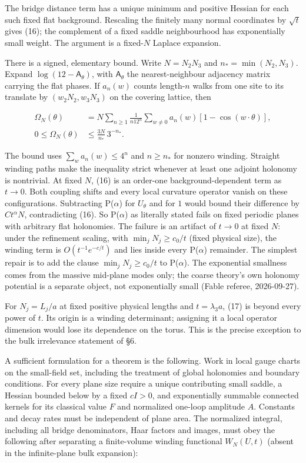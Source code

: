 \documentclass[11pt,a4paper]{article}
\begin{document}
The bridge distance term has a unique minimum and positive Hessian for
each such fixed flat background. Rescaling the finitely many normal
coordinates by \(\sqrt t\) gives (16); the complement of a fixed saddle
neighbourhood has exponentially small weight. The argument is a
fixed-\(N\) Laplace expansion.

There is a signed, elementary bound. Write \(N=N_2N_3\) and
\(n_*=\min(N_2,N_3)\). Expand \(\log(12-\mathsf A_\theta)\), with
\(\mathsf A_\theta\) the nearest-neighbour adjacency matrix carrying the
flat phases. If \(a_n(w)\) counts length-\(n\) walks from one site to
its translate by \((w_2N_2,w_3N_3)\) on the covering lattice, then

\[\begin{aligned}
\Omega_N(\theta)
 &=N\sum_{n\ge1}\frac1{n12^n}\sum_{w\ne0}
 a_n(w)[1-\cos(w\cdot\theta)],\\
0\le\Omega_N(\theta)&\le
\frac{3N}{n_*}\,3^{-n_*}.
\end{aligned}\tag{17}\]

The bound uses \(\sum_wa_n(w)\le4^n\) and \(n\ge n_*\) for nonzero
winding. Straight winding paths make the inequality strict whenever at
least one adjoint holonomy is nontrivial. At fixed \(N\), (16) is an
order-one background-dependent term as \(t\to0\). Both coupling shifts
and every local curvature operator vanish on these configurations.
Subtracting P(\(\alpha\)) for \(U_\theta\) and for \(1\) would bound
their difference by \(Ct^\alpha N\), contradicting (16). So
P(\(\alpha\)) as literally stated fails on fixed periodic planes with
arbitrary flat holonomies. The failure is an artifact of \(t\to0\) at
fixed \(N\): under the refinement scaling, with \(\min_jN_j\ge c_0/t\)
(fixed physical size), the winding term is \(O(t^{-1}e^{-c/t})\) and
lies inside every P(\(\alpha\)) remainder. The simplest repair is to add
the clause \(\min_jN_j\ge c_0/t\) to P(\(\alpha\)). The exponential
smallness comes from the massive mid-plane modes only; the coarse
theory's own holonomy potential is a separate object, not exponentially
small (Fable referee, 2026-09-27).

For \(N_j=L_j/a\) at fixed positive physical lengths and
\(t=\lambda_3a\), (17) is beyond every power of \(t\). Its origin is a
winding determinant; assigning it a local operator dimension would lose
its dependence on the torus. This is the precise exception to the bulk
irrelevance statement of §6.

A sufficient formulation for a theorem is the following. Work in local
gauge charts on the small-field set, including the treatment of global
holonomies and boundary conditions. For every plane size require a
unique contributing small saddle, a Hessian bounded below by a fixed
\(cI>0\), and exponentially summable connected kernels for its classical
value \(F\) and normalized one-loop amplitude \(A\). Constants and decay
rates must be independent of plane area. The normalized integral,
including all bridge denominators, Haar factors and images, must obey
the following after separating a finite-volume winding functional
\(W_N(U,t)\) (absent in the infinite-plane bulk expansion):
\end{document}
